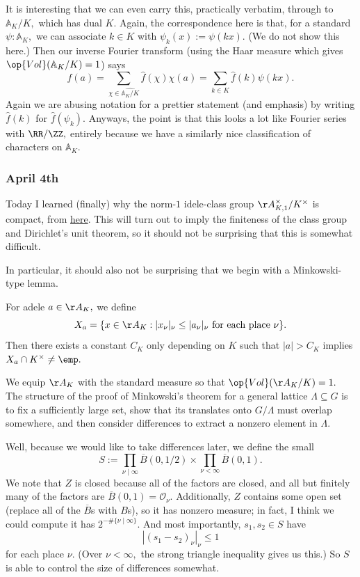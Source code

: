 It is interesting that we can even carry this, practically verbatim, through to $\mathbb A_K/K,$ which has dual $K.$ Again, the correspondence here is that, for a standard $\psi:\mathbb A_K,$ we can associate $k\in K$ with $\psi_k(x):=\psi(kx).$ (We do not show this here.) Then our inverse Fourier transform (using the Haar measure which gives $\op{Vol}(\mathbb A_K/K)=1$) says
\[f(a)=\sum_{\chi\in\widehat{\mathbb A_K/K}}\hat f(\chi)\chi(a)=\sum_{k\in K}\hat f(k)\psi(kx).\]
Again we are abusing notation for a prettier statement (and emphasis) by writing $\hat f(k)$ for $\hat f(\psi_k).$ Anyways, the point is that this looks a lot like Fourier series with $\RR/\ZZ,$ entirely because we have a similarly nice classification of characters on $\mathbb A_K.$

\subsubsection{April 4th}
Today I learned (finally) why the norm-$1$ idele-class group $\AA^\times_{K,1}/K^\times$ is compact, from \href{https://web.archive.org/web/20210406035224/http://math.stanford.edu/~conrad/676Page/handouts/compactidele.pdf}{here}. This will turn out to imply the finiteness of the class group and Dirichlet's unit theorem, so it should not be surprising that this is somewhat difficult.

In particular, it should also not be surprising that we begin with a Minkowski-type lemma.
\begin{lemma}
    For adele $a\in\AA_K,$ we define
    \[X_a=\{x\in\AA_K:|x_\nu|_\nu\le|a_\nu|_\nu\text{ for each place }\nu\}.\]
    Then there exists a constant $C_K$ only depending on $K$ such that $|a|>C_K$ implies $X_a\cap K^\times\ne\emp.$
\end{lemma}
We equip $\AA_K$ with the standard measure so that $\op{Vol}(\AA_K/K)=1.$ The structure of the proof of Minkowski's theorem for a general lattice $\Lambda\subseteq G$ is to fix a sufficiently large set, show that its translates onto $G/\Lambda$ must overlap somewhere, and then consider differences to extract a nonzero element in $\Lambda.$

Well, because we would like to take differences later, we define the small
\[S:=\prod_{\nu\mid\infty}\overline B(0,1/2)\times\prod_{\nu<\infty}\overline B(0,1).\]
We note that $Z$ is closed because all of the factors are closed, and all but finitely many of the factors are $\overline B(0,1)=\mathcal O_\nu.$ Additionally, $Z$ contains some open set (replace all of the $\overline B$s with $B$s), so it has nonzero measure; in fact, I think we could compute it has $2^{-\#\{\nu\mid\infty\}}.$ And most importantly, $s_1,s_2\in S$ have
\[|(s_1-s_2)_\nu|_\nu\le1\]
for each place $\nu.$ (Over $\nu<\infty,$ the strong triangle inequality gives us this.) So $S$ is able to control the size of differences somewhat.

